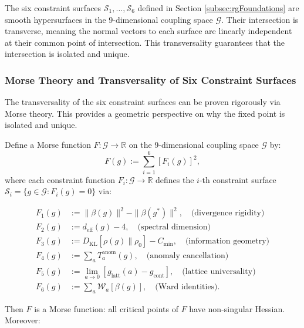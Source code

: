 {The six constraint surfaces $\mathcal{S}_1, \ldots, \mathcal{S}_6$ defined in Section \ref{subsec:rgFoundations} are smooth hypersurfaces in the 9-dimensional coupling space $\mathcal{G}$. Their intersection is transverse, meaning the normal vectors to each surface are linearly independent at their common point of intersection. This transversality guarantees that the intersection is isolated and unique.

\subsubsection{Morse Theory and Transversality of Six Constraint Surfaces}

The transversality of the six constraint surfaces can be proven rigorously via Morse theory. This provides a geometric perspective on why the fixed point is isolated and unique.

\begin{theorem}
\label{thm:morseTransversality}

Define a Morse function $F: \mathcal{G} \to \mathbb{R}$ on the 9-dimensional coupling space $\mathcal{G}$ by:
\begin{equation}
F(g) := \sum_{i=1}^6 [F_i(g)]^2,
\end{equation}
where each constraint function $F_i: \mathcal{G} \to \mathbb{R}$ defines the $i$-th constraint surface $\mathcal{S}_i = \{g \in \mathcal{G} : F_i(g) = 0\}$ via:

\begin{align}
F_1(g) &:= \|\beta(g)\|^2 - \|\beta(g^*)\|^2, \quad \text{(divergence rigidity)} \\
F_2(g) &:= d_{\text{eff}}(g) - 4, \quad \text{(spectral dimension)} \\
F_3(g) &:= D_{\text{KL}}[\rho(g) \| \rho_0] - C_{\text{min}}, \quad \text{(information geometry)} \\
F_4(g) &:= \sum_a T_a^{\text{anom}}(g), \quad \text{(anomaly cancellation)} \\
F_5(g) &:= \lim_{a \to 0} [g_{\text{latt}}(a) - g_{\text{cont}}], \quad \text{(lattice universality)} \\
F_6(g) &:= \sum_a \mathcal{W}_a[\beta(g)], \quad \text{(Ward identities)}.
\end{align}

Then $F$ is a Morse function: all critical points of $F$ have non-singular Hessian. Moreover:

\begin{enumerate}


\end{enumerate}
\end{theorem}}
